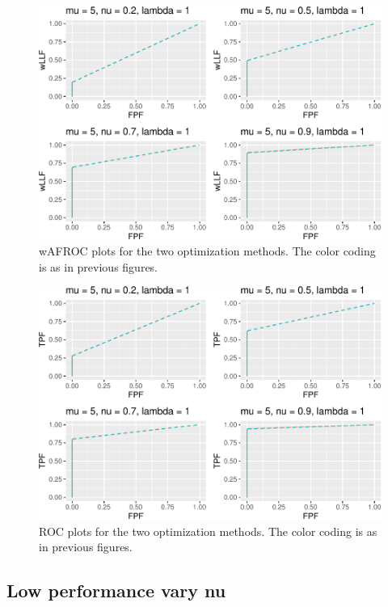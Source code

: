 \documentclass[
]{book}
\begin{document}
\begin{figure}
\centering
\includegraphics{21-optim-op-point_files/figure-latex/optim-op-point-high-performance-vary-nu-vary-all-wafroc-1.pdf}
\caption{\label{fig:optim-op-point-high-performance-vary-nu-vary-all-wafroc}wAFROC plots for the two optimization methods. The color coding is as in previous figures.}
\end{figure}

\begin{figure}
\centering
\includegraphics{21-optim-op-point_files/figure-latex/optim-op-point-high-performance-vary-nu-vary-all-roc-1.pdf}
\caption{\label{fig:optim-op-point-high-performance-vary-nu-vary-all-roc}ROC plots for the two optimization methods. The color coding is as in previous figures.}
\end{figure}

\hypertarget{optim-op-point-low-performance-vary-nu}{%
\subsection{Low performance vary nu}\label{optim-op-point-low-performance-vary-nu}}
\end{document}
